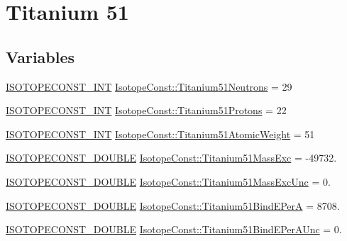 \hypertarget{group___isotope_const-_titanium-_ti51}{}\section{Titanium 51}
\label{group___isotope_const-_titanium-_ti51}
\subsection*{Variables}
\begin{DoxyCompactItemize}
\item 
\mbox{\hyperlink{group___isotope_const-_macros_ga5f18360b3e99483a35c32d789e62621c}{I\+S\+O\+T\+O\+P\+E\+C\+O\+N\+S\+T\+\_\+\+I\+NT}} \mbox{\hyperlink{group___isotope_const-_titanium-_ti51_ga39e63d0369aff673f4a3459fd0f64b84}{Isotope\+Const\+::\+Titanium51\+Neutrons}} = 29
\item 
\mbox{\hyperlink{group___isotope_const-_macros_ga5f18360b3e99483a35c32d789e62621c}{I\+S\+O\+T\+O\+P\+E\+C\+O\+N\+S\+T\+\_\+\+I\+NT}} \mbox{\hyperlink{group___isotope_const-_titanium-_ti51_ga9341ddfe0d1ba7dfb6d95bedcfc119d8}{Isotope\+Const\+::\+Titanium51\+Protons}} = 22
\item 
\mbox{\hyperlink{group___isotope_const-_macros_ga5f18360b3e99483a35c32d789e62621c}{I\+S\+O\+T\+O\+P\+E\+C\+O\+N\+S\+T\+\_\+\+I\+NT}} \mbox{\hyperlink{group___isotope_const-_titanium-_ti51_gafdf271635ffe0af2bf161122f33f3579}{Isotope\+Const\+::\+Titanium51\+Atomic\+Weight}} = 51
\item 
\mbox{\hyperlink{group___isotope_const-_macros_ga8f45a7272ce02c0b4c65c44636ed719a}{I\+S\+O\+T\+O\+P\+E\+C\+O\+N\+S\+T\+\_\+\+D\+O\+U\+B\+LE}} \mbox{\hyperlink{group___isotope_const-_titanium-_ti51_gaf3e557b5760527f359a5761bfb28a71a}{Isotope\+Const\+::\+Titanium51\+Mass\+Exc}} = -\/49732.
\item 
\mbox{\hyperlink{group___isotope_const-_macros_ga8f45a7272ce02c0b4c65c44636ed719a}{I\+S\+O\+T\+O\+P\+E\+C\+O\+N\+S\+T\+\_\+\+D\+O\+U\+B\+LE}} \mbox{\hyperlink{group___isotope_const-_titanium-_ti51_ga965a0357e5738a9061b31aba5f775b15}{Isotope\+Const\+::\+Titanium51\+Mass\+Exc\+Unc}} = 0.
\item 
\mbox{\hyperlink{group___isotope_const-_macros_ga8f45a7272ce02c0b4c65c44636ed719a}{I\+S\+O\+T\+O\+P\+E\+C\+O\+N\+S\+T\+\_\+\+D\+O\+U\+B\+LE}} \mbox{\hyperlink{group___isotope_const-_titanium-_ti51_ga3b601d58df176f511c7363c659b24fc5}{Isotope\+Const\+::\+Titanium51\+Bind\+E\+PerA}} = 8708.
\item 
\mbox{\hyperlink{group___isotope_const-_macros_ga8f45a7272ce02c0b4c65c44636ed719a}{I\+S\+O\+T\+O\+P\+E\+C\+O\+N\+S\+T\+\_\+\+D\+O\+U\+B\+LE}} \mbox{\hyperlink{group___isotope_const-_titanium-_ti51_ga0527917e9b2104e8cb3ecccc4ce2e5fa}{Isotope\+Const\+::\+Titanium51\+Bind\+E\+Per\+A\+Unc}} = 0.

\end{DoxyCompactItemize}
